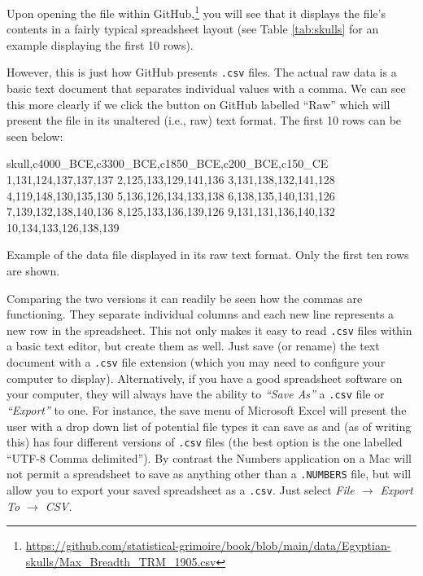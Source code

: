 Upon opening the file within GitHub,\footnote{\url{https://github.com/statistical-grimoire/book/blob/main/data/Egyptian-skulls/Max_Breadth_TRM_1905.csv}} you will see that it displays the file's contents in a fairly typical spreadsheet layout (see Table \ref{tab:skulls} for an example displaying the first 10 rows).

\vspace{1em}



\vspace{1em}

\noindent
However, this is just how GitHub presents \texttt{.csv} files. The actual raw data is a basic text document that separates individual values with a comma. We can see this more clearly if we click the button on GitHub labelled ``Raw'' which will present the file in its unaltered (i.e., raw) text format. The first 10 rows can be seen below:

\vspace{1em}
\begin{listing}[H]
\begin{raw}
skull,c4000_BCE,c3300_BCE,c1850_BCE,c200_BCE,c150_CE
1,131,124,137,137,137
2,125,133,129,141,136
3,131,138,132,141,128
4,119,148,130,135,130
5,136,126,134,133,138
6,138,135,140,131,126
7,139,132,138,140,136
8,125,133,136,139,126
9,131,131,136,140,132
10,134,133,126,138,139
\end{raw}
\caption*{Example of the  data file displayed in its raw text format. Only the first ten rows are shown.}
\end{listing}

\vspace{1em}

Comparing the two versions it can readily be seen how the commas are functioning. They separate individual columns and each new line represents a new row in the spreadsheet. This not only makes it easy to read \texttt{.csv} files within a basic text editor, but create them as well. Just save (or rename) the text document with a \texttt{.csv} file extension (which you may need to configure your computer to display). Alternatively, if you have a good spreadsheet software on your computer, they will always have the ability to \textit{``Save As''} a \texttt{.csv} file or \textit{``Export''} to one. For instance, the save menu of Microsoft Excel will present the user with a drop down list of potential file types it can save as and (as of writing this) has four different versions of \texttt{.csv} files (the best option is the one labelled ``UTF-8 Comma delimited''). By contrast the Numbers application on a Mac will not permit a spreadsheet to save as anything other than a \texttt{.NUMBERS} file, but will allow you to export your saved spreadsheet as a \texttt{.csv}. Just select \textit{File $\rightarrow$ Export To $\rightarrow$ CSV.}

